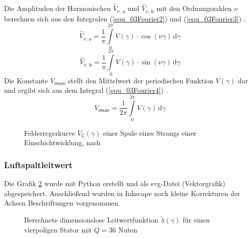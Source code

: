 Die Amplituden der Harmonischen $\hat{V}_{\nu\textsf{, a}}$ und $\hat{V}_{\nu\textsf{, b}}$ mit den Ordnungszahlen $\nu$ berechnen sich aus den Integralen (\ref{equ_03Fourier2}) und (\ref{equ_03Fourier3}) \cite{Binder.2017}.
%
\begin{equation}
\hat{V}_{\nu\textsf{, a}} = \frac{1}{\pi} \int\limits_{0}^{2\pi} V(\gamma) \cdot \cos(\nu\gamma) \,\text{d}\gamma
\label{equ_03Fourier2}
\end{equation}
%
%
\begin{equation}
\hat{V}_{\nu\textsf{, b}} = \frac{1}{\pi} \int\limits_{0}^{2\pi} V(\gamma) \cdot \sin(\nu\gamma) \,\text{d}\gamma
\label{equ_03Fourier3}
\end{equation}
%
Die Konstante $V_\textsf{mean}$ stellt den Mittelwert der periodischen Funktion $V(\gamma)$ dar und ergibt sich aus dem Integral (\ref{equ_03Fourier4}) \cite{Binder.2017}.
%
\begin{equation}
V_\textsf{mean} = \frac{1}{2\pi} \int\limits_{0}^{2\pi} V(\gamma) \,\text{d}\gamma
\label{equ_03Fourier4}
\end{equation}
%

\begin{figure}[h]
\centering
\def\svgwidth{490pt}

\caption[Felderregerkurve $V_\textsf{C}(\gamma)$ einer Spule eines Strangs einer Einschichtwicklung]{Felderregerkurve $V_\textsf{C}(\gamma)$ einer Spule eines Strangs einer Einschichtwicklung, nach \cite{Binder.2017}}
\label{fig_03Fourier1}
\end{figure}

\subsubsection{Luftspaltleitwert}
\label{ch_03Nutoeffnung}

Die Grafik \ref{fig_03Nutoeffnung1} wurde mit Python erstellt und als svg-Datei (Vektorgrafik) abgespeichert. Anschließend wurden in Inkscape noch kleine Korrekturen der Achsen Beschriftungen vorgenommen.
\begin{figure}[h]
\centering
\def\svgwidth{340pt}

\caption[Berechnete dimensionslose Leitwertfunktion $\tilde{\lambda}(\gamma)$ für einen vierpoligen Stator]{Berechnete dimensionslose Leitwertfunktion $\tilde{\lambda}(\gamma)$ für einen vierpoligen Stator mit $Q=36$ Nuten}
\label{fig_03Nutoeffnung1}
\end{figure}